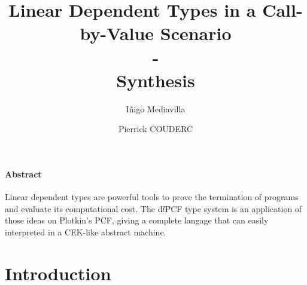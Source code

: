 \documentclass[a4paper,12pt]{article}
\title{Linear Dependent Types in a Call-by-Value Scenario \\
- \\
Synthesis}
\author{I\~{n}igo Mediavilla \and Pierrick COUDERC}
\begin{document}
\maketitle









\paragraph{Abstract} 
Linear dependent types are powerful tools to prove the termination of
programs and evaluate its computational cost. The d$l$PCF type system is an
application of those ideas on Plotkin's PCF, giving a complete langage that can
easily interpreted in a CEK-like abstract machine.

\section{Introduction}
\end{document}
